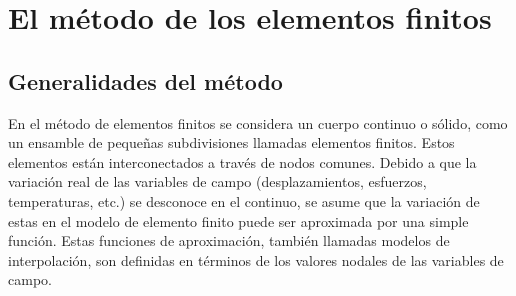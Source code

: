 





\section{El método de los elementos finitos}

\subsection{Generalidades del método}

En el método de elementos finitos se considera un cuerpo continuo o sólido, como un ensamble de pequeñas 
subdivisiones llamadas elementos finitos. Estos elementos están interconectados a través de nodos comunes. 
Debido a que la variación real de las variables de campo (desplazamientos, esfuerzos, temperaturas, etc.) 
se desconoce en el continuo, se asume que la variación de estas en el modelo de elemento finito puede ser 
aproximada por una simple función. Estas funciones de aproximación, también llamadas modelos de interpolación, 
son definidas en términos de los valores nodales de las variables de campo.\\

